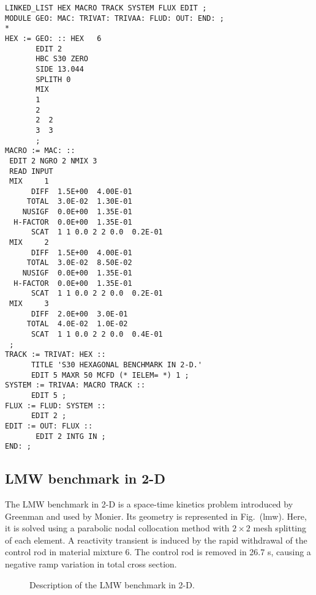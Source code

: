 \begin{verbatim}
LINKED_LIST HEX MACRO TRACK SYSTEM FLUX EDIT ;
MODULE GEO: MAC: TRIVAT: TRIVAA: FLUD: OUT: END: ;
*
HEX := GEO: :: HEX   6
       EDIT 2
       HBC S30 ZERO
       SIDE 13.044
       SPLITH 0
       MIX
       1
       2
       2  2
       3  3
       ;
MACRO := MAC: ::
 EDIT 2 NGRO 2 NMIX 3
 READ INPUT
 MIX     1
      DIFF  1.5E+00  4.00E-01
     TOTAL  3.0E-02  1.30E-01
    NUSIGF  0.0E+00  1.35E-01
  H-FACTOR  0.0E+00  1.35E-01
      SCAT  1 1 0.0 2 2 0.0  0.2E-01
 MIX     2
      DIFF  1.5E+00  4.00E-01
     TOTAL  3.0E-02  8.50E-02
    NUSIGF  0.0E+00  1.35E-01
  H-FACTOR  0.0E+00  1.35E-01
      SCAT  1 1 0.0 2 2 0.0  0.2E-01
 MIX     3
      DIFF  2.0E+00  3.0E-01
     TOTAL  4.0E-02  1.0E-02
      SCAT  1 1 0.0 2 2 0.0  0.4E-01
 ;
TRACK := TRIVAT: HEX ::
      TITLE 'S30 HEXAGONAL BENCHMARK IN 2-D.'
      EDIT 5 MAXR 50 MCFD (* IELEM= *) 1 ;
SYSTEM := TRIVAA: MACRO TRACK ::
      EDIT 5 ;
FLUX := FLUD: SYSTEM ::
      EDIT 2 ;
EDIT := OUT: FLUX ::
       EDIT 2 INTG IN ;
END: ;
\end{verbatim}

\subsection{LMW benchmark in 2-D}

The LMW benchmark in 2-D is a space-time kinetics problem introduced by Greenman\cite{greenman} and used by Monier\cite{monier}.
Its geometry is represented in Fig.~\fig(lmw). Here, it is solved using a parabolic nodal collocation method with $2\times 2$ mesh splitting
of each element. A reactivity transient is induced by the rapid withdrawal of the control rod in material mixture 6. The control rod is
removed in 26.7 s, causing a negative ramp variation in total cross section.

\begin{figure}[htbp]
\begin{center} 
\epsfxsize=7cm
\centerline{ }
\parbox{14cm}{\caption{Description of the LMW benchmark in 2-D.}\label{fig:lmw}}  \end{center} 
\end{figure}

